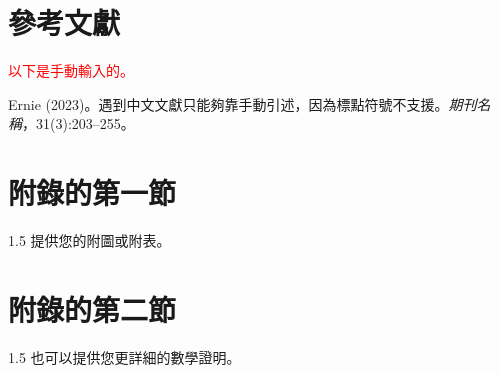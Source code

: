 \documentclass[utf8,12pt]{article} %
\begin{document}
\section*{參考文獻}
\printbibliography[heading=none]{\fontsize{12}{20pt}\selectfont}
%
\laref \textcolor{red}{以下是手動輸入的。}

\laref Ernie (2023)。遇到中文文獻只能夠靠手動引述，因為標點符號不支援。\emph{期刊名稱}，31(3):203--255。\label{StatEconLabCite}


%
%
\appendix
\appendixpage
\section{附錄的第一節}
%
\begin{spacing}{1.5}
%
	提供您的附圖或附表。
%
\end{spacing}
%
\section{附錄的第二節}
%
\begin{spacing}{1.5}
%
	也可以提供您更詳細的數學證明。
%
\end{spacing}
%
\end{document}
